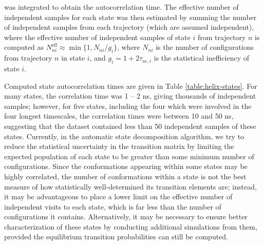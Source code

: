 was
integrated to obtain the autocorrelation time.
The effective number of independent samples for each state was then estimated by summing the number of independent samples from each trajectory (which are assumed independent), where the effective number of independent samples of state $i$ from trajectory $n$ is computed as  $N^\mathrm{eff}_{ni} \approx \min\{ 1, N_{ni} / g_i \}$, where $N_{ni}$ is the number of configurations from trajectory $n$ in state $i$, and $g_i = 1 + 2 \tau_{\mathrm{ac},i}$ is the statistical inefficiency of state $i$.

Computed state autocorrelation times are given in Table \ref{table:helix-states}.
For many states, the correlation time was 1 -- 2 ns, giving thousands of independent samples; however, for five states, including the four which were involved in the four longest timescales, the correlation times were between 10 and 50 ns, suggesting that the dataset contained less than 
50
independent samples of these states.
Currently, in the automatic state decomposition algorithm, we try to reduce the statistical uncertainty in the transition matrix by limiting the expected population of each state to be greater than some minimum number of configurations.
Since the conformations appearing within some states may be highly correlated, the number of conformations within a state is not the best measure of how statistically well-determined its transition elements are; instead, it may be advantageous to place a lower limit on the effective number of independent visits to each state, which is far less than the number of configurations it contains.
Alternatively, it may be necessary to ensure better characterization of these states by conducting additional simulations from them, provided the equilibrium transition probabilities can still be computed.


